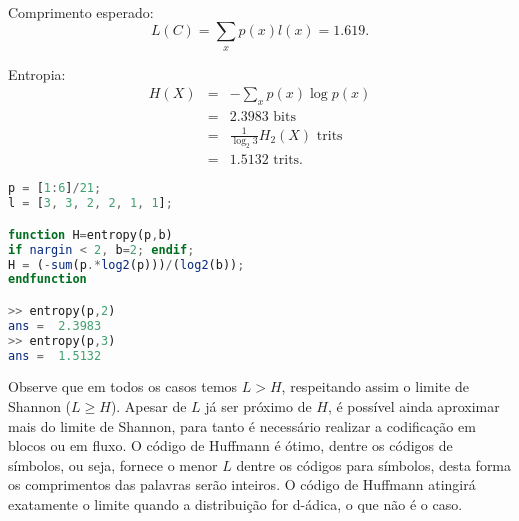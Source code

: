 \begin{questions}
\begin{solution}
\begin{parts}
\begin{minipage}[b]{0.35\textwidth}
   \ \\
   Comprimento esperado:
   \begin{equation}
   L(C) = \sum_x p(x) l(x) = 1.619 .
   \end{equation}


   Entropia:
   \begin{eqnarray}
   H(X) &=& - \sum_x p(x) \log p(x) \nonumber \\ 
        &=& 2.3983 \text{ bits} \nonumber \\
        &=& \frac{1}{\log_2 3} H_2(X) \text{ trits} \nonumber \\
        &=& 1.5132 \text{ trits} .
   \end{eqnarray}
\end{minipage}

\begin{lstlisting}[language=Octave]
p = [1:6]/21;
l = [3, 3, 2, 2, 1, 1];

function H=entropy(p,b)
if nargin < 2, b=2; endif;
H = (-sum(p.*log2(p)))/(log2(b));
endfunction

>> entropy(p,2)
ans =  2.3983
>> entropy(p,3)
ans =  1.5132
\end{lstlisting}

Observe que em todos os casos temos $L > H$, respeitando assim o limite de Shannon ($L \geq H$).
Apesar de $L$ já ser próximo de $H$, é possível ainda aproximar mais do limite de Shannon,
para tanto é necessário realizar a codificação em blocos ou em fluxo. O código de Huffmann é ótimo,
dentre os códigos de símbolos, ou seja, fornece o menor $L$ dentre os códigos para símbolos, desta
forma os comprimentos das palavras serão inteiros. O código de Huffmann atingirá exatamente o limite
quando a distribuição for d-ádica, o que não é o caso.


\end{parts}
\end{solution}
\end{questions}

